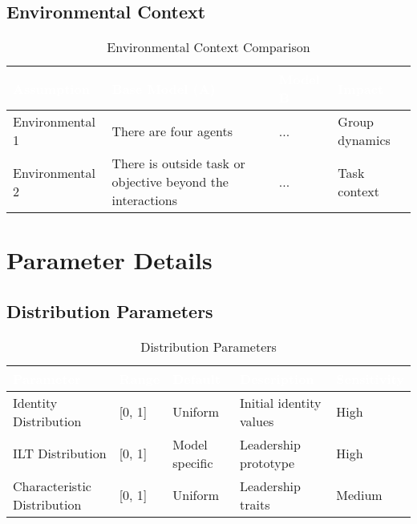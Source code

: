 \documentclass[12pt]{article}
\begin{document}
\subsection{Environmental Context}
\begin{table}[H]
\begin{tabular}{L{3cm}|L{5cm}|L{5cm}|L{3cm}}
\textcolor{white}{\textbf{Assumption}} & \textcolor{white}{\textbf{Base Model (A)}} & \textcolor{white}{\textbf{Model B}} & \textcolor{white}{\textbf{Impact}} \\
\hline
Environmental 1 & There are four agents & ... & Group dynamics \\
Environmental 2 & There is outside task or objective beyond the interactions & ... & Task context \\
\end{tabular}
\caption{Environmental Context Comparison}
\end{table}

\section{Parameter Details}

\subsection{Distribution Parameters}
\begin{table}[H]
\begin{tabular}{L{3cm}|L{2cm}|L{3cm}|L{4cm}|L{3cm}}
\textcolor{white}{\textbf{Parameter}} & \textcolor{white}{\textbf{Range}} & \textcolor{white}{\textbf{Default}} & \textcolor{white}{\textbf{Description}} & \textcolor{white}{\textbf{Sensitivity}} \\
\hline
Identity Distribution & [0, 1] & Uniform & Initial identity values & High \\
ILT Distribution & [0, 1] & Model specific & Leadership prototype & High \\
Characteristic Distribution & [0, 1] & Uniform & Leadership traits & Medium \\
\end{tabular}
\caption{Distribution Parameters}
\end{table}
\end{document}
